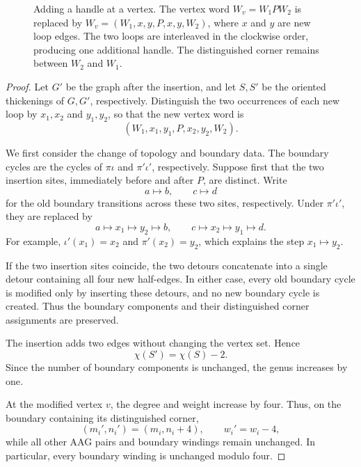 \documentclass[11pt]{amsart}
\theoremstyle{definition}
\theoremstyle{plain}
\theoremstyle{definition}
\theoremstyle{definition}
\begin{document}
\begin{figure}[htbp]
{%
}
\caption{Adding a handle at a vertex.  The vertex word
$W_v=W_1PW_2$ is replaced by
$W_v=(W_1,x,y,P,x,y,W_2)$, where $x$ and $y$ are new loop
edges.  The two loops are interleaved in the clockwise order,
producing one additional handle.  The distinguished corner
remains between $W_2$ and $W_1$.}
\label{fig:classification-handle}
\end{figure}
\begin{proof}
Let $G'$ be the graph after the insertion, and let $S,S'$
be the oriented thickenings of $G,G'$, respectively.
Distinguish the two occurrences of
each new loop by $x_1,x_2$ and $y_1,y_2$, so that the new
vertex word is
\[
  (W_1,x_1,y_1,P,x_2,y_2,W_2).
\]

We first consider the change of topology and boundary data.
The boundary cycles are the cycles of $\pi\iota$ and
$\pi'\iota'$, respectively. Suppose first that the two
insertion sites, immediately before and after $P$, are
distinct. Write
\[
  a\longmapsto b,
  \qquad
  c\longmapsto d
\]
for the old boundary transitions across these two sites,
respectively. Under $\pi'\iota'$, they are replaced by
\[
  a\longmapsto x_1\longmapsto y_2\longmapsto b,
  \qquad
  c\longmapsto x_2\longmapsto y_1\longmapsto d.
\]
For example, $\iota'(x_1)=x_2$ and $\pi'(x_2)=y_2$,
which explains the step $x_1\longmapsto y_2$.

If the two insertion sites coincide, the two detours
concatenate into a single detour containing all four new
half-edges. In either case, every old boundary cycle is
modified only by inserting these detours, and no new
boundary cycle is created. Thus the boundary components
and their distinguished corner assignments are preserved.


The insertion adds two edges without changing the vertex
set.  Hence
\[
  \chi(S')=\chi(S)-2.
\]
Since the number of boundary components is unchanged,
the genus increases by one.

At the modified vertex $v$, the degree and weight increase
by four.  Thus, on the boundary containing its
distinguished corner,
\[
  (m_i',n_i')=(m_i,n_i+4),
  \qquad w_i'=w_i-4,
\]
while all other AAG pairs and boundary windings remain
unchanged.  In particular, every boundary winding is
unchanged modulo four.


\end{proof}
\end{document}
